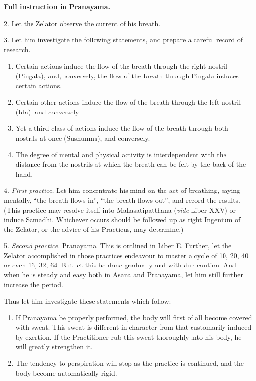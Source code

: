 

\textbf{Full instruction in Pranayama.} 

2. Let the Zelator observe the current of his breath.

3. Let him investigate the following statements, and prepare a careful record of research.

\begin{enumerate}[label=(\textit{\alph*})]
\item Certain actions induce the flow of the breath through the right nostril (Pingala); and, conversely, the flow of the breath through Pingala induces certain actions.
\item Certain other actions induce the flow of the breath through the left nostril (Ida), and conversely.
\item Yet a third class of actions induce the flow of the breath through both nostrils at once (Sushumna), and conversely.
\item The degree of mental and physical activity is interdependent with the distance from the nostrils at which the breath can be felt by the back of the hand.
\end{enumerate}

4. \textit{First practice.} Let him concentrate his mind on the act of breathing, saying mentally, \enquote{the breath flows in}, \enquote{the breath flows out}, and record the results. (This practice may resolve itself into Mahasatipatthana (\textit{vide} Liber XXV) or induce Samadhi. Whichever occurs should be followed up as right Ingenium of the Zelator, or the advice of his Practicus, may determine.)

5. \textit{Second practice.} Pranayama. This is outlined in Liber E. Further, let the Zelator accomplished in those practices endeavour to master a cycle of 10, 20, 40 or even 16, 32, 64. But let this be done gradually and with due caution. And when he is steady and easy both in Asana and Pranayama, let him still further increase the period.

Thus let him investigate these statements which follow:
\begin{enumerate}[label=(\textit{\alph*})]
\item If Pranayama be properly performed, the body will first of all become covered with sweat. This sweat is different in character from that customarily induced by exertion. If the Practitioner rub this sweat thoroughly into his body, he will greatly strengthen it.
\item The tendency to perspiration will stop as the practice is continued, and the body become automatically rigid.
\end{enumerate}

